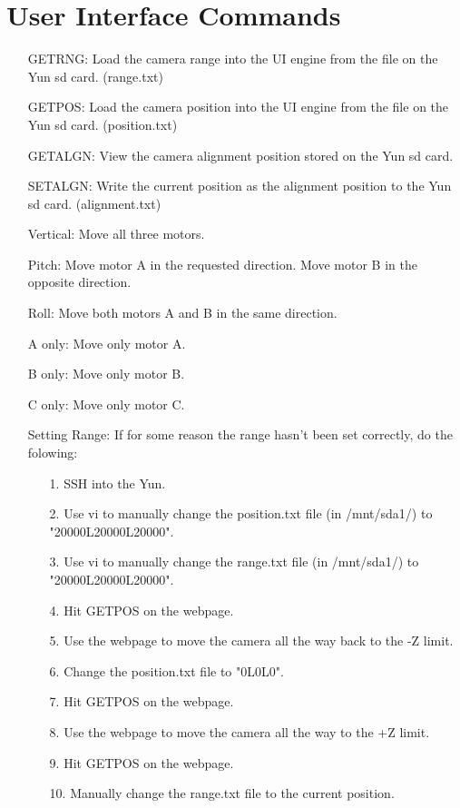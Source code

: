 \documentclass[11pt]{article}
\begin{document}
\section{User Interface Commands}
\begin{enumerate}
	\item[GETRNG:] Load the camera range into the UI engine from the file on the Yun sd card. (range.txt)
	\item[GETPOS:] Load the camera position into the UI engine from the file on the Yun sd card. (position.txt)
	\item[GETALGN:] View the camera alignment position stored on the Yun sd card.
	\item[SETALGN:] Write the current position as the alignment position to the Yun sd card. (alignment.txt)
	\item[Vertical:] Move all three motors.
	\item[Pitch:] Move motor A in the requested direction. Move motor B in the opposite direction.
	\item[Roll:] Move both motors A and B in the same direction.
	\item[A only:] Move only motor A.
	\item[B only:] Move only motor B.
	\item[C only:] Move only motor C.
	
	\item[Setting Range:] If for some reason the range hasn't been set correctly, do the folowing:
	\begin{enumerate} 
		\item[1.]SSH into the Yun.
		\item[2.]Use vi to manually change the position.txt file (in /mnt/sda1/) to "20000L20000L20000".
		\item[3.]Use vi to manually change the range.txt file (in /mnt/sda1/) to "20000L20000L20000".
		\item[4.]Hit GETPOS on the webpage.
		\item[5.]Use the webpage to move the camera all the way back to the -Z limit.
		\item[6.]Change the position.txt file to "0L0L0".
		\item[7.]Hit GETPOS on the webpage.
		\item[8.]Use the webpage to move the camera all the way to the +Z limit.
		\item[9.]Hit GETPOS on the webpage.
		\item[10.]Manually change the range.txt file to the current position.
	\end{enumerate}
\end{enumerate}
\end{document}
